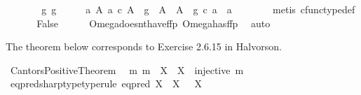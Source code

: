 \begin{isabellebody}
\ \ \ \ \isamarkupfalse%
\ \isamarkupfalse%
\ {\isachardoublequoteopen}{\isasymexists}g{\isachardot}{\kern0pt}\ g\ {\isacharcolon}{\kern0pt}\ {\isasymOmega}\ {\isasymrightarrow}\ {\isasymOmega}\ {\isasymand}\ {\isacharparenleft}{\kern0pt}{\isasymforall}a{\isachardot}{\kern0pt}\ {\isacharparenleft}{\kern0pt}{\isasymforall}A{\isachardot}{\kern0pt}\ a\ {\isasymin}\isactrlsub c\ A\ {\isasymlongrightarrow}\ g\ {\isacharcolon}{\kern0pt}\ A\ {\isasymrightarrow}\ A\ {\isasymlongrightarrow}\ g\ {\isasymcirc}\isactrlsub c\ a\ {\isasymnoteq}\ a{\isacharparenright}{\kern0pt}{\isacharparenright}{\kern0pt}{\isachardoublequoteclose}\isanewline
\ \ \ \ \ \ \isamarkupfalse%
\ {\isacharparenleft}{\kern0pt}metis\ cfunc{\isacharunderscore}{\kern0pt}type{\isacharunderscore}{\kern0pt}def{\isacharparenright}{\kern0pt}\isanewline
\ \ \isamarkupfalse%
\isanewline
\ \ \isamarkupfalse%
\ False\isanewline
\ \ \ \ \isamarkupfalse%
\ Omega{\isacharunderscore}{\kern0pt}doesnt{\isacharunderscore}{\kern0pt}have{\isacharunderscore}{\kern0pt}ffp\ Omega{\isacharunderscore}{\kern0pt}has{\isacharunderscore}{\kern0pt}ffp\ \isamarkupfalse%
\ auto\isanewline
{}\isamarkupfalse%
%
\endisatagproof
{\isafoldproof}%
%
\isadelimproof
%
\endisadelimproof
%
\begin{isamarkuptext}%
The theorem below corresponds to Exercise 2.6.15 in Halvorson.%
\end{isamarkuptext}\isamarkuptrue%
\isamarkupfalse%
\ Cantors{\isacharunderscore}{\kern0pt}Positive{\isacharunderscore}{\kern0pt}Theorem{\isacharcolon}{\kern0pt}\isanewline
\ \ {\isachardoublequoteopen}{\isasymexists}m{\isachardot}{\kern0pt}\ m\ {\isacharcolon}{\kern0pt}\ X\ {\isasymrightarrow}\ {\isasymOmega}\isactrlbsup X\isactrlesup \ {\isasymand}\ injective\ m{\isachardoublequoteclose}\isanewline
%
\isadelimproof
%
\endisadelimproof
%
\isatagproof
{}\isamarkupfalse%
\ {\isacharminus}{\kern0pt}\ \isanewline
\ \ \isamarkupfalse%
\ eq{\isacharunderscore}{\kern0pt}pred{\isacharunderscore}{\kern0pt}sharp{\isacharunderscore}{\kern0pt}type{\isacharbrackleft}{\kern0pt}type{\isacharunderscore}{\kern0pt}rule{\isacharbrackright}{\kern0pt}{\isacharcolon}{\kern0pt}\ {\isachardoublequoteopen}eq{\isacharunderscore}{\kern0pt}pred\ X\isactrlsup {\isasymsharp}\ {\isacharcolon}{\kern0pt}\ X\ {\isasymrightarrow}\ \ {\isasymOmega}\isactrlbsup X\isactrlesup {\isachardoublequoteclose}\isanewline
\ \ \ \ \isamarkupfalse%

\end{isabellebody}
